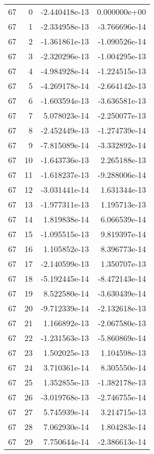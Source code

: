 \begin{tabular}{rrrr}
  67 &    0 & -2.440418e-13 &  0.000000e+00 \\
  67 &    1 & -2.334958e-13 & -3.766696e-14 \\
  67 &    2 & -1.361861e-13 & -1.090526e-14 \\
  67 &    3 & -2.320296e-13 & -1.004295e-13 \\
  67 &    4 & -4.984928e-14 & -1.224515e-13 \\
  67 &    5 & -4.269178e-14 & -2.664142e-13 \\
  67 &    6 & -1.603594e-13 & -3.636581e-13 \\
  67 &    7 &  5.078023e-14 & -2.250077e-13 \\
  67 &    8 & -2.452449e-13 & -1.274739e-14 \\
  67 &    9 & -7.815089e-14 & -3.332892e-14 \\
  67 &   10 & -1.643736e-13 &  2.265188e-13 \\
  67 &   11 & -1.618237e-13 & -9.288006e-14 \\
  67 &   12 & -3.031441e-14 &  1.631344e-13 \\
  67 &   13 & -1.977311e-13 &  1.195713e-13 \\
  67 &   14 &  1.819838e-14 &  6.066539e-14 \\
  67 &   15 & -1.095515e-13 &  9.819397e-14 \\
  67 &   16 &  1.105852e-13 &  8.396773e-14 \\
  67 &   17 & -2.140599e-13 &  1.350707e-13 \\
  67 &   18 & -5.192445e-14 & -8.472143e-14 \\
  67 &   19 &  8.522580e-14 & -3.630439e-14 \\
  67 &   20 & -9.712339e-14 & -2.132618e-13 \\
  67 &   21 &  1.166892e-13 & -2.067580e-13 \\
  67 &   22 & -1.231563e-13 & -5.860869e-14 \\
  67 &   23 &  1.502025e-13 &  1.104598e-13 \\
  67 &   24 &  3.710361e-14 &  8.305550e-14 \\
  67 &   25 &  1.352855e-13 & -1.382178e-13 \\
  67 &   26 & -3.019768e-13 & -2.746755e-14 \\
  67 &   27 &  5.745939e-14 &  3.214715e-13 \\
  67 &   28 &  7.062930e-14 &  1.804283e-14 \\
  67 &   29 &  7.750644e-14 & -2.386613e-14 \\

\end{tabular}
